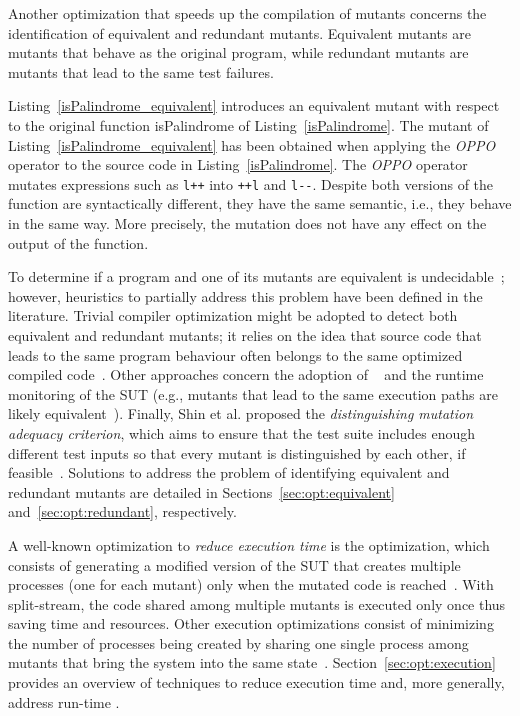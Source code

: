 Another optimization that speeds up the compilation of mutants concerns the identification of equivalent and redundant mutants. Equivalent mutants are mutants that behave as the original program, while redundant mutants are mutants that lead to the same test failures. 




Listing~\ref{isPalindrome_equivalent} introduces an equivalent mutant with respect to the original function isPalindrome of Listing~\ref{isPalindrome}. The mutant of Listing~\ref{isPalindrome_equivalent} has been obtained when applying the \textit{OPPO} operator to the source code in Listing~\ref{isPalindrome}. The \textit{OPPO} operator mutates expressions such as \texttt{l++} into \texttt{++l} and \texttt{l-}\texttt{-}.
Despite both versions of the function are syntactically different, they have the same semantic, i.e., they behave in the same way. More precisely, the mutation does not have any effect on the output of the function.

To determine if a program and one of its mutants are
equivalent is undecidable~\cite{Budd:1982}; however, heuristics to partially address this problem have been defined in the literature.
Trivial compiler optimization might be adopted to detect both equivalent and redundant mutants; it relies on the idea that source code that leads to the same program behaviour often belongs to the same optimized compiled code~\cite{papadakis2015trivial}. Other approaches concern the adoption of ~\cite{papadakis2012mutation,kurtz2015static} and the runtime monitoring of the SUT (e.g., mutants that lead to the same execution paths are likely equivalent~\cite{schuler2013covering}). Finally, Shin et al. proposed the \emph{distinguishing mutation adequacy criterion}, which aims to ensure that the test suite includes enough different test inputs so that every mutant is distinguished by each other, if feasible~\cite{shin2017theoretical}. 
Solutions to address the problem of identifying equivalent and redundant mutants are detailed in Sections~\ref{sec:opt:equivalent} and~\ref{sec:opt:redundant}, respectively.


A well-known optimization to \emph{reduce execution time} is the  optimization, which consists of generating a modified version of the SUT that creates multiple processes (one for each mutant) only when the mutated code is reached~\cite{tokumoto2016muvm}. With split-stream, the code shared among multiple mutants is executed only once thus saving time and resources. Other execution optimizations consist of minimizing the number of processes being created by sharing one single process among mutants that bring the system into the same state~\cite{wang2017faster}.
Section~\ref{sec:opt:execution} provides an overview of techniques to reduce execution time and, more generally, address run-time .

